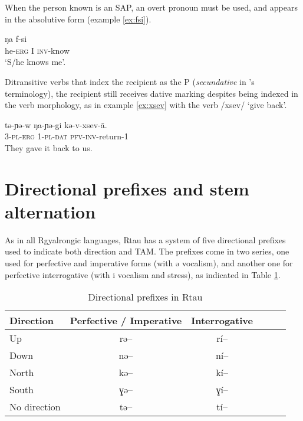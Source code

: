 \documentclass[oneside,a4paper,11pt]{article}
\newcommand{\ipa}[1]{{\phon #1}} %
\begin{document}
When the person known is an SAP, an overt  pronoun must be used, and appears in the absolutive form (example \ref{ex:fsi}).

\begin{exe}
\ex \label{ex:fsi}
\gll \ipa{tə-w}  	\ipa{ŋa}  	\ipa{f-si}  
 \\
he-\textsc{erg} I \textsc{inv}-know \\
\glt `S/he knows me'.
\end{exe}


Ditransitive verbs that index the recipient as the P (\textit{secundative} in \citealt{malchukov10ditransitive}'s terminology), the recipient still receives dative marking despites being indexed in the verb morphology, as in example \ref{ex:xsev} with the verb /xsev/ `give back'.

\begin{exe}
\ex \label{ex:xsev}
\glt \ipa{təɲu ŋaɲəgi kəxsã}
\gll
\ipa{tə-ɲə-w}  	\ipa{ŋa-ɲə-gi}  	\ipa{kə-v-xsev-ã.}  \\
3-\textsc{pl-erg} 1-\textsc{pl-dat} \textsc{pfv-inv}-return-1 \\
\glt They gave it back to us.
\end{exe}

\section{Directional prefixes and stem alternation} \label{sec:dir.pref}
As in all Rgyalrongic languages, Rtau has a system of five directional prefixes used to indicate both direction and TAM. The prefixes come in two series, one used for perfective and imperative forms (with \ipa{ə} vocalism), and another one for perfective interrogative (with \ipa{i} vocalism and stress), as indicated in Table \ref{tab:dir.pref}.



\begin{table}[H]
\caption{Directional prefixes in Rtau} \label{tab:dir.pref} \centering
\begin{tabular}{lccccc}
\toprule
Direction & Perfective / Imperative & Interrogative \\
\midrule
 Up & \ipa{rə--} & \ipa{rí--} \\
Down & \ipa{nə--} & \ipa{ní--} \\
North  & \ipa{kə--} & \ipa{kí--} \\
South & \ipa{ɣə--} & \ipa{ɣí--} \\
No direction & \ipa{tə--} & \ipa{tí--} \\
\bottomrule
\end{tabular}
\end{table}
\end{document}
